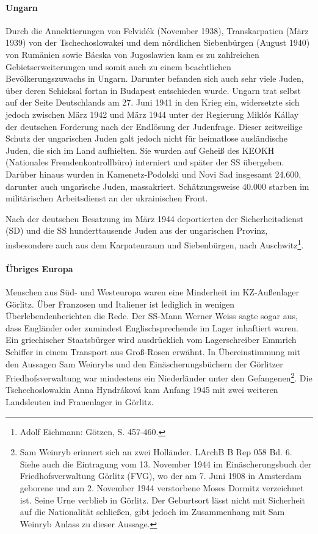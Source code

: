 \paragraph{Ungarn}\label{ungarn} Durch die Annektierungen von Felvid\'ek (November 1938), Transkarpatien (März 1939) von der Tschechoslowakei und dem nördlichen Siebenbürgen (August 1940) von Rumänien sowie B\'acska von Jugoslawien kam es zu zahlreichen Gebietserweiterungen und somit auch zu einem beachtlichen Bevölkerungszuwachs in Ungarn. Darunter befanden sich auch sehr viele Juden, über deren Schicksal fortan in Budapest entschieden wurde. Ungarn trat selbst auf der Seite Deutschlands am 27. Juni 1941 in den Krieg ein, widersetzte
sich jedoch zwischen März 1942 und März 1944 unter der Regierung Mikl\'os K\'allay der deutschen Forderung nach der Endlösung der Judenfrage. Dieser zeitweilige Schutz der ungarischen Juden galt jedoch nicht für heimatlose ausländische Juden, die sich im Land aufhielten. Sie wurden auf Geheiß des KEOKH (Nationales Fremdenkontrollbüro) interniert und später der SS übergeben. Darüber hinaus wurden in Kamenetz-Podolski und Novi Sad insgesamt 24.600, darunter auch ungarische Juden, massakriert. Schätzungsweise 40.000 starben im militärischen Arbeitsdienst an der ukrainischen Front.

Nach der deutschen Besatzung im März 1944 deportierten der Sicherheitsdienst (SD) und die SS hunderttausende Juden aus der ungarischen Provinz, insbesondere auch aus dem Karpatenraum und Siebenbürgen, nach Auschwitz\footnote{Adolf Eichmann: Götzen, S. 457-460.}.
\newpage
\paragraph{Übriges Europa} Menschen aus Süd- und Westeuropa waren eine Minderheit im KZ-Außenlager Görlitz. Über Franzosen und Italiener ist lediglich in wenigen Überlebendenberichten die Rede. Der SS-Mann Werner Weiss sagte sogar aus, dass Engländer oder zumindest Englischsprechende im Lager inhaftiert waren. Ein griechischer Staatsbürger wird ausdrücklich vom Lagerschreiber Emmrich Schiffer in einem Transport aus Groß-Rosen erwähnt. In Übereinstimmung mit den Aussagen Sam Weinrybs und den Einäscherungsbüchern der Görlitzer Friedhofsverwaltung war mindestens ein Niederländer unter den Gefangenen\footnote{Sam Weinryb erinnert sich an zwei \glqq Holländer\grqq. LArchB B Rep 058 Bd. 6. Siehe auch die Eintragung vom 13. November 1944 im Einäscherungsbuch der Friedhofsverwaltung Görlitz (FVG), wo der am 7. Juni 1908 in Amsterdam geborene und am 2. November 1944 verstorbene Moses Dormitz verzeichnet ist. Seine Urne verblieb in Görlitz. Der Geburtsort lässt nicht mit Sicherheit auf die Nationalität schließen, gibt jedoch im Zusammenhang mit Sam Weinryb Anlass zu dieser Aussage.}. Die Tschechoslowakin Anna Hyndr\'akov\'a kam Anfang 1945 mit zwei weiteren Landsleuten ind Frauenlager in Görlitz.

